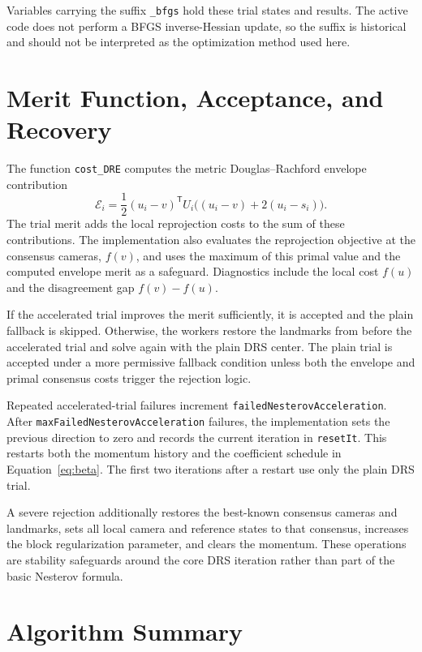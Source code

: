 \documentclass[11pt]{article}
\begin{document}
Variables carrying the suffix \verb|_bfgs| hold these trial states and
results.  The active code does not perform a BFGS inverse-Hessian update, so
the suffix is historical and should not be interpreted as the optimization
method used here.

\section{Merit Function, Acceptance, and Recovery}

The function \verb|cost_DRE| computes the metric Douglas--Rachford envelope
contribution
\begin{equation}
  \mathcal{E}_i
  =\frac{1}{2}(u_i-v)^{\mathsf T}U_i
    \bigl((u_i-v)+2(u_i-s_i)\bigr).
  \label{eq:dre}
\end{equation}
The trial merit adds the local reprojection costs to the sum of these
contributions.  The implementation also evaluates the reprojection objective
at the consensus cameras, $f(v)$, and uses the maximum of this primal value
and the computed envelope merit as a safeguard.  Diagnostics include the
local cost $f(u)$ and the disagreement gap $f(v)-f(u)$.

If the accelerated trial improves the merit sufficiently, it is accepted and
the plain fallback is skipped.  Otherwise, the workers restore the landmarks
from before the accelerated trial and solve again with the plain DRS center.
The plain trial is accepted under a more permissive fallback condition unless
both the envelope and primal consensus costs trigger the rejection logic.

Repeated accelerated-trial failures increment
\verb|failedNesterovAcceleration|.  After
\verb|maxFailedNesterovAcceleration| failures, the implementation sets the
previous direction to zero and records the current iteration in
\verb|resetIt|.  This restarts both the momentum history and the coefficient
schedule in Equation~\eqref{eq:beta}.  The first two iterations after a
restart use only the plain DRS trial.

A severe rejection additionally restores the best-known consensus cameras
and landmarks, sets all local camera and reference states to that consensus,
increases the block regularization parameter, and clears the momentum.  These
operations are stability safeguards around the core DRS iteration rather
than part of the basic Nesterov formula.

\section{Algorithm Summary}
\end{document}
